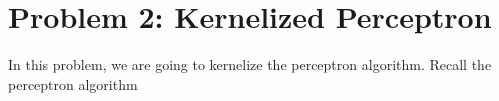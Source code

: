\documentclass{article}
\begin{document}
        
    
    
    
    


    

	\section*{Problem 2: Kernelized Perceptron}
	In this problem, we are going to kernelize the perceptron algorithm. Recall the perceptron algorithm
\end{document}
